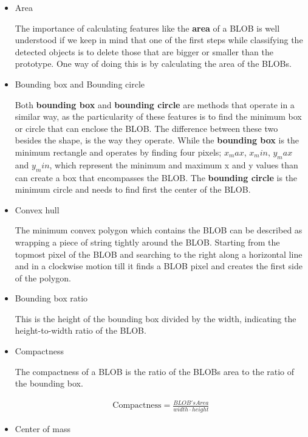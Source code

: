 \begin{itemize}
\item Area

The importance of calculating features like the \textbf{area} of a BLOB is well understood if we keep in mind that one of the first steps while classifying the detected objects is to delete those that are bigger or smaller than the prototype. One way of doing this is by calculating the area of the BLOBs.

\item Bounding box and Bounding circle

Both \textbf{bounding box} and \textbf{bounding circle} are methods that operate in a similar way, as the particularity of these features is to find the minimum box or circle that can enclose the BLOB. The difference between these two besides the shape, is the way they operate. While the \textbf{bounding box} is the minimum rectangle and operates by finding four pixels; $x_max$, $x_min$, $y_max$ and $y_min$, which represent the minimum and maximum x and y values than can create a box that encompasses the BLOB. The \textbf{bounding circle} is the minimum circle and needs to find first the center of the BLOB.

\item Convex hull

The minimum convex polygon which contains the BLOB can be described as wrapping a piece of string tightly around the BLOB. Starting from the topmost pixel of the BLOB and searching to the right along a horizontal line and in a clockwise motion till it finds a BLOB pixel and creates the first side of the polygon.

\item Bounding box ratio

This is the height of the bounding box divided by the width, indicating the height-to-width ratio of the BLOB.

\item Compactness

The compactness of a BLOB is the ratio of the BLOBs area to the ratio of the bounding box.

\begin{equation}
	\begin{aligned}
	\text{Compactness}=\displaystyle\frac{BLOB's Area}{width\cdot{height}}
	\label{Compact}
	\end{aligned}
\end{equation}

\item Center of mass


\end{itemize}
